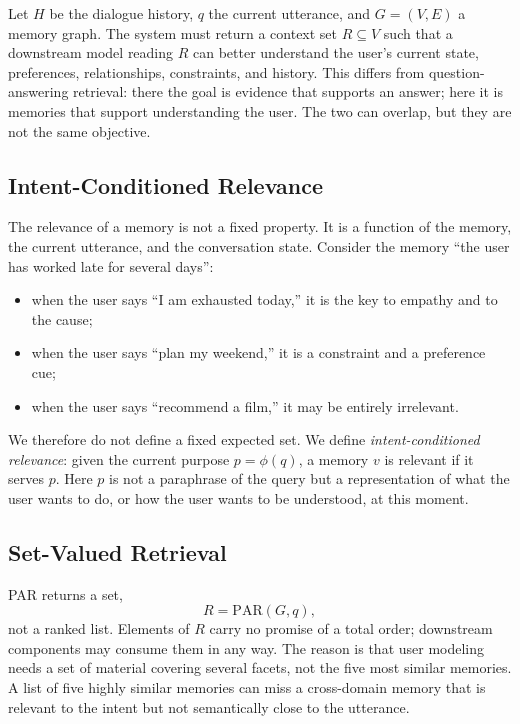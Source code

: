 \documentclass[11pt]{article}
\begin{document}
Let $H$ be the dialogue history, $q$ the current utterance, and $G=(V,E)$ a memory graph. The
system must return a context set $R\subseteq V$ such that a downstream model reading $R$ can
better understand the user's current state, preferences, relationships, constraints, and
history. This differs from question-answering retrieval: there the goal is evidence that
supports an answer; here it is memories that support understanding the user. The two can
overlap, but they are not the same objective.

\subsection{Intent-Conditioned Relevance}

The relevance of a memory is not a fixed property. It is a function of the memory, the current
utterance, and the conversation state. Consider the memory ``the user has worked late for
several days'':

\begin{itemize}
  \item when the user says ``I am exhausted today,'' it is the key to empathy and to the cause;
  \item when the user says ``plan my weekend,'' it is a constraint and a preference cue;
  \item when the user says ``recommend a film,'' it may be entirely irrelevant.
\end{itemize}

We therefore do not define a fixed expected set. We define \emph{intent-conditioned relevance}:
given the current purpose $p=\phi(q)$, a memory $v$ is relevant if it serves $p$. Here $p$ is
not a paraphrase of the query but a representation of what the user wants to do, or how the
user wants to be understood, at this moment.

\subsection{Set-Valued Retrieval}

PAR returns a set,
\begin{equation}
  R=\mathrm{PAR}(G,q),
\end{equation}
not a ranked list. Elements of $R$ carry no promise of a total order; downstream components may
consume them in any way. The reason is that user modeling needs a set of material covering
several facets, not the five most similar memories. A list of five highly similar memories can
miss a cross-domain memory that is relevant to the intent but not semantically close to the
utterance.
\end{document}
